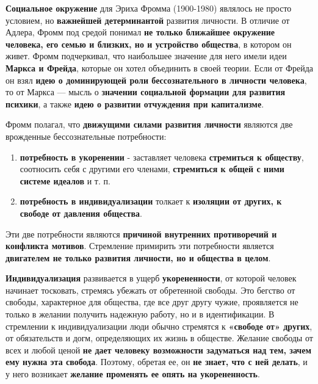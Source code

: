 \documentclass{article}
\begin{document}
\begin{flushleft}

\textbf{Социальное окружение} для Эриха Фромма (1900-1980) являлось не просто условием, но \textbf{важнейшей детерминантой} развития личности. В отличие от Адлера, Фромм под средой понимал \textbf{не только ближайшее окружение человека, его семью и близких, но и устройство общества}, в котором он живет. Фромм подчеркивал, что наибольшее значение для него имели идеи \textbf{Маркса и Фрейда}, которые он хотел объединить в своей теории. Если от Фрейда он взял \textbf{идею о доминирующей роли бессознательного в личности человека}, то от Маркса — мысль о \textbf{значении социальной формации для развития психики}, а также \textbf{идею о развитии отчуждения при капитализме}.

\hfill

Фромм полагал, что \textbf{движущими силами развития личности} являются две врожденные бессознательные потребности: 

\begin{enumerate}
\item \textbf{потребность в укоренении} - заставляет человека \textbf{стремиться к обществу}, соотносить себя с другими его членами, \textbf{стремиться к общей с ними системе идеалов} и т. п.
\item \textbf{потребность в индивидуализации} толкает к \textbf{изоляции от других, к свободе от давления общества}. 
\end{enumerate}

Эти две потребности являются \textbf{причиной внутренних противоречий и конфликта мотивов}. Стремление примирить эти потребности является \textbf{двигателем не только развития личности, но и общества в целом}.

\hfill

\textbf{Индивидуализация} развивается в ущерб \textbf{укорененности}, от которой человек начинает тосковать, стремясь убежать от обретенной свободы. Это бегство от свободы, характерное для общества, где все друг другу чужие, проявляется не только в желании получить надежную работу, но и в идентификации. В стремлении к индивидуализации люди обычно стремятся к \textbf{«свободе от» других}, от обязательств и догм, определяющих их жизнь в обществе. Желание свободы от всех и любой ценой \textbf{не дает человеку возможности задуматься над тем, зачем ему нужна эта свобода}. Поэтому, обретая ее, он \textbf{не знает, что с ней делать}, и у него возникает \textbf{желание променять ее опять на укорененность}.


\end{flushleft}
\end{document}
